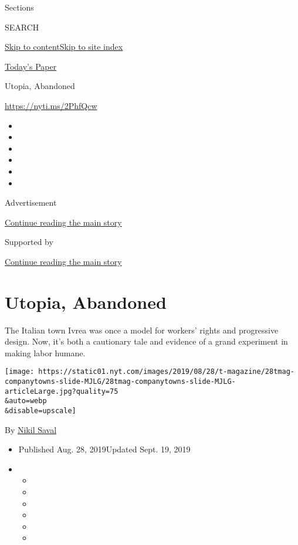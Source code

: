 Sections

SEARCH

\protect\hyperlink{site-content}{Skip to
content}\protect\hyperlink{site-index}{Skip to site index}

\href{https://myaccount.nytimes.com/auth/login?response_type=cookie\&client_id=vi}{}

\href{https://www.nytimes.com/section/todayspaper}{Today's Paper}

Utopia, Abandoned

\href{https://nyti.ms/2PhfQcw}{https://nyti.ms/2PhfQcw}

\begin{itemize}
\item
\item
\item
\item
\item
\item
\end{itemize}

Advertisement

\protect\hyperlink{after-top}{Continue reading the main story}

Supported by

\protect\hyperlink{after-sponsor}{Continue reading the main story}

\hypertarget{utopia-abandoned}{%
\section{Utopia, Abandoned}\label{utopia-abandoned}}

The Italian town Ivrea was once a model for workers' rights and
progressive design. Now, it's both a cautionary tale and evidence of a
grand experiment in making labor humane.

\texttt{[image: https://static01.nyt.com/images/2019/08/28/t-magazine/28tmag-companytowns-slide-MJLG/28tmag-companytowns-slide-MJLG-articleLarge.jpg?quality=75\\\&auto=webp\\\&disable=upscale]}

By \href{https://www.nytimes.com/by/nikil-saval}{Nikil Saval}

\begin{itemize}
\item
  Published Aug. 28, 2019Updated Sept. 19, 2019
\item
  \begin{itemize}
  \item
  \item
  \item
  \item
  \item
  \item
  \end{itemize}
\end{itemize}

